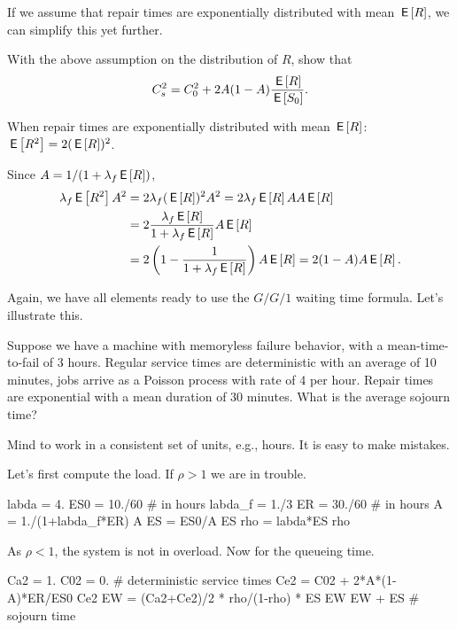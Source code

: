If we assume that repair times are exponentially distributed with mean $\,\mathsf{E}\left[R\right]$, we can simplify this yet further.

\begin{exercise}[\faCalculator]
With the above assumption on the distribution of $R$, show that
  \begin{equation*}
    C_s^2 = C_0^2 + 2 A(1-A) \frac{\,\mathsf{E}\left[R\right]}{\,\mathsf{E}\left[S_0\right]}.
  \end{equation*}
\begin{solution} 
When repair times are exponentially distributed with mean $\,\mathsf{E}\left[R\right]$:  $\,\mathsf{E}\left[R^2\right]=2(\,\mathsf{E}\left[R\right])^2$. 

Since $A=1/(1+\lambda_f \,\mathsf{E}\left[R\right])$, 
  \begin{equation*}
    \begin{split}
    \lambda_f \,\mathsf{E}\left[R^2\right] A^2 
&= 2\lambda_f (\,\mathsf{E}\left[R\right])^2 A^2 = 2 \lambda_f \,\mathsf{E}\left[R\right] A A \,\mathsf{E}\left[R\right] \\
&= 2 \frac{\lambda_f \,\mathsf{E}\left[R\right] }{1+\lambda_f \,\mathsf{E}\left[R\right]} A \,\mathsf{E}\left[R\right] \\
&= 2 \left(1-\frac{1}{1+\lambda_f \,\mathsf{E}\left[R\right]}\right) A \,\mathsf{E}\left[R\right]  = 2(1-A)A \,\mathsf{E}\left[R\right].
    \end{split}
  \end{equation*}
\end{solution}
\end{exercise}

Again, we have all elements ready to use the $G/G/1$ waiting time formula. Let's illustrate this. 

\begin{exercise}[\faPhoto]
  Suppose we have a machine with memoryless failure behavior, with a mean-time-to-fail of $3$ hours. Regular service times are deterministic with an average of 10 minutes, jobs arrive as a Poisson process with rate of 4 per hour.  Repair times are exponential with a mean duration of 30 minutes. What is the average sojourn time?
  \begin{hint}
    Mind to work in a consistent set of units, e.g., hours. It is easy to make mistakes. 
  \end{hint}
  \begin{solution}
Let's first compute the load. If $\rho>1$ we are in trouble.
    \begin{pyconsole}
labda = 4.
ES0 = 10./60 # in hours
labda_f = 1./3
ER = 30./60 # in hours
A = 1./(1+labda_f*ER)
A
ES = ES0/A
ES
rho = labda*ES
rho
    \end{pyconsole}
As $\rho<1$, the system is not in overload. Now for the queueing time.
\begin{pyconsole}
Ca2 = 1.
C02 = 0. # deterministic service times
Ce2 = C02 + 2*A*(1-A)*ER/ES0
Ce2
EW = (Ca2+Ce2)/2 * rho/(1-rho) * ES
EW
EW + ES # sojourn time
\end{pyconsole}
  \end{solution}
\end{exercise}

